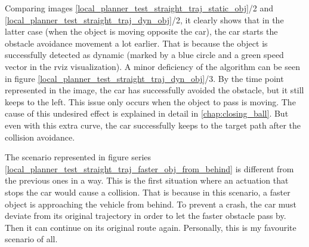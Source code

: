 Comparing images \ref{local_planner_test_straight_traj_static_obj}/2 and \ref{local_planner_test_straight_traj_dyn_obj}/2, it clearly shows that in the latter case (when the object is moving opposite the car), the car starts the obstacle avoidance movement a lot earlier. That is because the object is successfully detected as dynamic (marked by a blue circle and a green speed vector in the rviz visualization). A minor deficiency of the algorithm can be seen in figure \ref{local_planner_test_straight_traj_dyn_obj}/3. By the time point represented in the image, the car has successfully avoided the obstacle, but it still keeps to the left. This issue only occurs when the object to pass is moving. The cause of this undesired effect is explained in detail in \ref{chap:closing_ball}. But even with this extra curve, the car successfully keeps to the target path after the collision avoidance.

The scenario represented in figure series \ref{local_planner_test_straight_traj_faster_obj_from_behind} is different from the previous ones in a way. This is the first situation where an actuation that stops the car would cause a collision. That is because in this scenario, a faster object is approaching the vehicle from behind. To prevent a crash, the car must deviate from its original trajectory in order to let the faster obstacle pass by. Then it can continue on its original route again. Personally, this is my favourite scenario of all.

